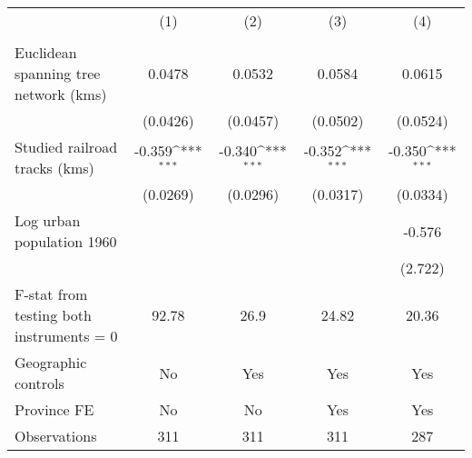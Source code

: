 {
\def\sym#1{\ifmmode^{#1}\else\(^{#1}\)\fi}
\begin{tabular}{l*{4}{c}}
\hline\hline
                &\multicolumn{1}{c}{(1)}&\multicolumn{1}{c}{(2)}&\multicolumn{1}{c}{(3)}&\multicolumn{1}{c}{(4)}\\
                &\multicolumn{1}{c}{}&\multicolumn{1}{c}{}&\multicolumn{1}{c}{}&\multicolumn{1}{c}{}\\
\hline
Euclidean spanning tree network (kms)&   0.0478         &   0.0532         &   0.0584         &   0.0615         \\
                & (0.0426)         & (0.0457)         & (0.0502)         & (0.0524)         \\
[1em]
Studied railroad tracks (kms)&   -0.359\sym{***}&   -0.340\sym{***}&   -0.352\sym{***}&   -0.350\sym{***}\\
                & (0.0269)         & (0.0296)         & (0.0317)         & (0.0334)         \\
[1em]
Log urban population 1960&                  &                  &                  &   -0.576         \\
                &                  &                  &                  &  (2.722)         \\
\hline
F-stat from testing both instruments = 0&    92.78         &     26.9         &    24.82         &    20.36         \\
Geographic controls&       No         &      Yes         &      Yes         &      Yes         \\
Province FE     &       No         &       No         &      Yes         &      Yes         \\
Observations    &      311         &      311         &      311         &      287         \\
\hline\hline
\end{tabular}
}
